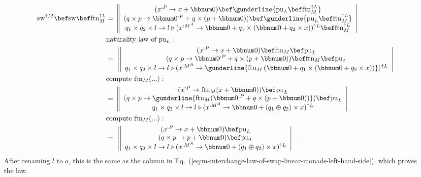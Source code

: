 \begin{align*}
\text{sw}^{\uparrow M}\bef\text{sw}\bef\text{ftn}_{M}^{\uparrow L} & =\,\left\Vert \begin{array}{c}
(x^{:P}\rightarrow x+\bbnum 0)\bef\gunderline{\text{pu}_{L}\bef\text{ftn}_{M}^{\uparrow L}}\\
(q\times p\rightarrow\bbnum 0^{:P}+q\times\left(p+\bbnum 0\right))\bef\gunderline{\text{pu}_{L}\bef\text{ftn}_{M}^{\uparrow L}}\\
q_{1}\times q_{2}\times l\rightarrow l\triangleright(x^{:M^{A}}\rightarrow\bbnum 0+q_{1}\times(\bbnum 0+q_{2}\times x))^{\uparrow L}\bef\text{ftn}_{M}^{\uparrow L}
\end{array}\right|\\
 & \text{naturality law of }\text{pu}_{L}:\quad\\
 & =\,\,\left\Vert \begin{array}{c}
(x^{:P}\rightarrow x+\bbnum 0)\bef\text{ftn}_{M}\bef\text{pu}_{L}\\
(q\times p\rightarrow\bbnum 0^{:P}+q\times\left(p+\bbnum 0\right))\bef\text{ftn}_{M}\bef\text{pu}_{L}\\
q_{1}\times q_{2}\times l\rightarrow l\triangleright(x^{:M^{A}}\rightarrow\gunderline{\text{ftn}_{M}\left(\bbnum 0+q_{1}\times(\bbnum 0+q_{2}\times x)\right)})^{\uparrow L}
\end{array}\right|\\
 & \text{compute }\text{ftn}_{M}(...):\quad\\
 & =\,\left\Vert \begin{array}{c}
(x^{:P}\rightarrow\text{ftn}_{M}(x+\bbnum 0))\bef\text{pu}_{L}\\
(q\times p\rightarrow\gunderline{\text{ftn}_{M}(\bbnum 0^{:P}+q\times\left(p+\bbnum 0\right))})\bef\text{pu}_{L}\\
q_{1}\times q_{2}\times l\rightarrow l\triangleright(x^{:M^{A}}\rightarrow\bbnum 0+\left(q_{1}\oplus q_{2}\right)\times x)^{\uparrow L}
\end{array}\right|\\
 & \text{compute }\text{ftn}_{M}(...):\quad\\
 & =\,\,\left\Vert \begin{array}{c}
(x^{:P}\rightarrow x+\bbnum 0)\bef\text{pu}_{L}\\
(q\times p\rightarrow p+\bbnum 0)\bef\text{pu}_{L}\\
q_{1}\times q_{2}\times l\rightarrow l\triangleright(x^{:M^{A}}\rightarrow\bbnum 0+\left(q_{1}\oplus q_{2}\right)\times x)^{\uparrow L}
\end{array}\right|\quad.
\end{align*}
After renaming $l$ to $a$, this is the same as the column in Eq.~(\ref{eq:m-interchange-law-of-swap-linear-monads-left-hand-side}),
which proves the law.

